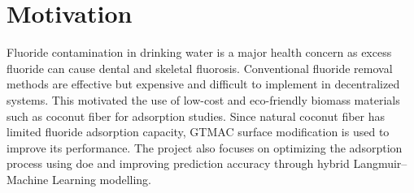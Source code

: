 %
%
%
%
%
%
%

\section[Motivation]{\textbf{Motivation}}

Fluoride contamination in drinking water is a major health concern as excess fluoride can cause dental and skeletal fluorosis. Conventional fluoride removal methods are effective but expensive and difficult to implement in decentralized systems. This motivated the use of low-cost and eco-friendly biomass materials such as coconut fiber for adsorption studies. Since natural coconut fiber has limited fluoride adsorption capacity, GTMAC surface modification is used to improve its performance. The project also focuses on optimizing the adsorption process using \gls{doe} and improving prediction accuracy through hybrid Langmuir–Machine Learning modelling. 

